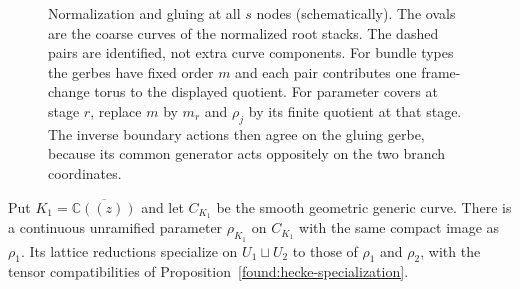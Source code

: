 \begin{figure}[tb]
\centering
{}
\caption{Normalization and gluing at all $s$ nodes (schematically).
The ovals are the coarse curves of the normalized root stacks.
The dashed pairs are identified, not extra curve components.
For bundle types the gerbes have fixed order $m$ and each pair
contributes one frame-change torus to the displayed quotient.
For parameter covers at stage $r$, replace $m$ by $m_r$ and
$\rho_j$ by its finite quotient at that stage.  The inverse boundary actions
then agree on the gluing gerbe, because its common generator acts
oppositely on the two branch coordinates.}\label{con:gluing-figure}
\end{figure}

\begin{lemma}\label{con:parameter}
Put $K_1=\overline{\mathbb C((z))}$ and let $C_{K_1}$ be the smooth
geometric generic curve.  There is a continuous unramified parameter
$\rho_{K_1}$ on $C_{K_1}$ with the same compact image as $\rho_1$.
Its lattice reductions specialize on $U_1\sqcup U_2$ to those of
$\rho_1$ and $\rho_2$, with the tensor compatibilities of
Proposition~\ref{found:hecke-specialization}.
\end{lemma}

